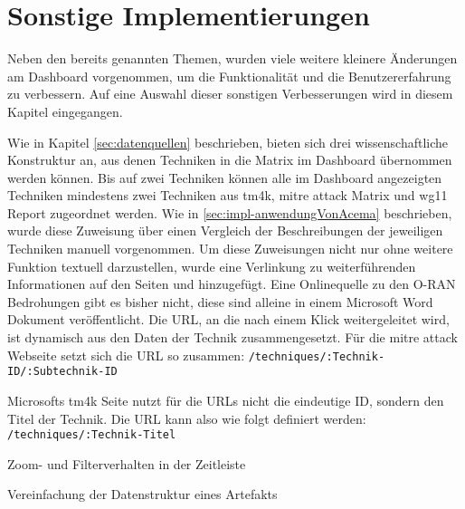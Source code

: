 \section{Sonstige Implementierungen}
Neben den bereits genannten Themen, wurden viele weitere kleinere Änderungen am Dashboard vorgenommen, um die Funktionalität und die Benutzererfahrung zu verbessern. Auf eine Auswahl dieser sonstigen Verbesserungen wird in diesem Kapitel eingegangen.

\par Wie in Kapitel \ref{sec:datenquellen} beschrieben, bieten sich drei wissenschaftliche Konstruktur an, aus denen Techniken in die Matrix im Dashboard übernommen werden können. Bis auf zwei Techniken können alle im Dashboard angezeigten Techniken mindestens zwei Techniken aus \gls{tm4k}, \gls{mitre} \gls{attack} Matrix und \gls{wg11} Report zugeordnet werden. Wie in \ref{sec:impl-anwendungVonAcema} beschrieben, wurde diese Zuweisung über einen Vergleich der Beschreibungen der jeweiligen Techniken manuell vorgenommen.
Um diese Zuweisungen nicht nur ohne weitere Funktion textuell darzustellen, wurde eine Verlinkung zu weiterführenden Informationen auf den Seiten \autocite{MITREATTCK} und \autocite{TacticsThreatMatrix} hinzugefügt. Eine Onlinequelle zu den O-RAN Bedrohungen gibt es bisher nicht, diese sind alleine in einem Microsoft Word Dokument veröffentlicht. Die URL, an die nach einem Klick weitergeleitet wird, ist dynamisch aus den Daten der Technik zusammengesetzt. Für die \gls{mitre} \gls{attack} Webseite setzt sich die URL so zusammen: \verb|/techniques/:Technik-ID/:Subtechnik-ID|
\par Microsofts \gls{tm4k} Seite nutzt für die URLs nicht die eindeutige ID, sondern den Titel der Technik. Die URL kann also wie folgt definiert werden: \verb|/techniques/:Technik-Titel|

\par Zoom- und Filterverhalten in der Zeitleiste

\par Vereinfachung der Datenstruktur eines Artefakts

